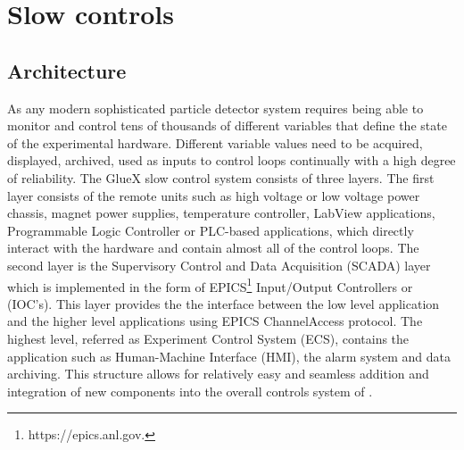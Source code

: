 
\section[Slow controls (Hovanes)]{Slow controls \label{sec:controls}}
\subsection{Architecture \label{sec:controlsarchitechture}}
As any modern sophisticated particle detector system \gx{} requires being able to monitor 
and control tens of thousands of different variables that define the state of the experimental hardware. Different variable values need to be acquired, displayed, archived, used as inputs to control loops continually with a high degree of reliability. The GlueX slow control system consists of three layers. The first layer consists of the remote units such as high voltage or low voltage power chassis, magnet power supplies, temperature controller, LabView applications, Programmable Logic Controller or PLC-based applications, which directly interact with the hardware and contain almost all of the control loops. The second layer is the Supervisory Control and Data Acquisition (SCADA) layer which is implemented in the form of EPICS\footnote{https://epics.anl.gov.} Input/Output Controllers or (IOC's). This layer provides the the interface between the low level application and the higher level applications using EPICS ChannelAccess protocol. The highest level, referred as Experiment Control System (ECS), contains the application such as Human-Machine Interface (HMI), the alarm system and data archiving. This structure allows for relatively easy and seamless addition and integration of new components into the overall controls system of \gx{}. 


